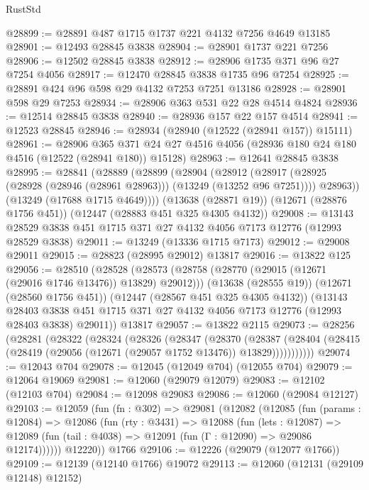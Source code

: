 \begin{lexlean}{RustStd}
\begin{coremodule}
@28899 := @28891 @487 @1715 @1737 @221 @4132 @7256 @4649 @13185
@28901 := @12493 @28845 @3838
@28904 := @28901 @1737 @221 @7256
@28906 := @12502 @28845 @3838
@28912 := @28906 @1735 @371 @96 @27 @7254 @4056
@28917 := @12470 @28845 @3838 @1735 @96 @7254
@28925 := @28891 @424 @96 @598 @29 @4132 @7253 @7251 @13186
@28928 := @28901 @598 @29 @7253
@28934 := @28906 @363 @531 @22 @28 @4514 @4824
@28936 := @12514 @28845 @3838
@28940 := @28936 @157 @22 @157 @4514
@28941 := @12523 @28845
@28946 := @28934 (@28940 (@12522 (@28941 @157)) @15111)
@28961 := @28906
    @365
    @371
    @24
    @27
    @4516
    @4056
    (@28936 @180 @24 @180 @4516 (@12522 (@28941 @180)) @15128)
@28963 := @12641 @28845 @3838
@28995 := @28841
    (@28889
      (@28899
        (@28904
          (@28912
            (@28917 (@28925 (@28928 (@28946 (@28961 @28963))) (@13249 (@13252 @96 @7251))))
            @28963))
        (@13249 (@17688 @1715 @4649))))
    (@13638 (@28871 @19))
    (@12671 (@28876 @1756 @451))
    (@12447 (@28883 @451 @325 @4305 @4132))
@29008 := @13143 @28529 @3838 @451 @1715 @371 @27 @4132 @4056 @7173 @12776 (@12993 @28529 @3838)
@29011 := @13249 (@13336 @1715 @7173)
@29012 := @29008 @29011
@29015 := @28823 (@28995 @29012) @13817
@29016 := @13822 @125
@29056 := @28510
    (@28528
      (@28573 (@28758 (@28770 (@29015 (@12671 (@29016 @1746 @13476)) @13829) @29012)))
      (@13638 (@28555 @19))
      (@12671 (@28560 @1756 @451))
      (@12447 (@28567 @451 @325 @4305 @4132))
      (@13143
        @28403
        @3838
        @451
        @1715
        @371
        @27
        @4132
        @4056
        @7173
        @12776
        (@12993 @28403 @3838)
        @29011))
    @13817
@29057 := @13822 @2115
@29073 := @28256
    (@28281
      (@28322
        (@28324
          (@28326
            (@28347
              (@28370
                (@28387
                  (@28404 (@28415 (@28419 (@29056 (@12671 (@29057 @1752 @13476)) @13829)))))))))))
@29074 := @12043 @704
@29078 := @12045 (@12049 @704) (@12055 @704)
@29079 := @12064 @19069
@29081 := @12060 (@29079 @12079)
@29083 := @12102 (@12103 @704)
@29084 := @12098 @29083
@29086 := @12060 (@29084 @12127)
@29103 := @12059
    (fun (fn : @302) =>
    @29081
      (@12082
        (@12085
          (fun (params : @12084) =>
          @12086
            (fun (rty : @3431) =>
            @12088
              (fun (lets : @12087) =>
              @12089 (fun (tail : @4038) => @12091 (fun (Γ : @12090) => @29086 @12174))))))
        @12220))
    @1766
@29106 := @12226 (@29079 (@12077 @1766))
@29109 := @12139 (@12140 @1766) @19072
@29113 := @12060 (@12131 (@29109 @12148) @12152)

\end{coremodule}
\end{lexlean}
